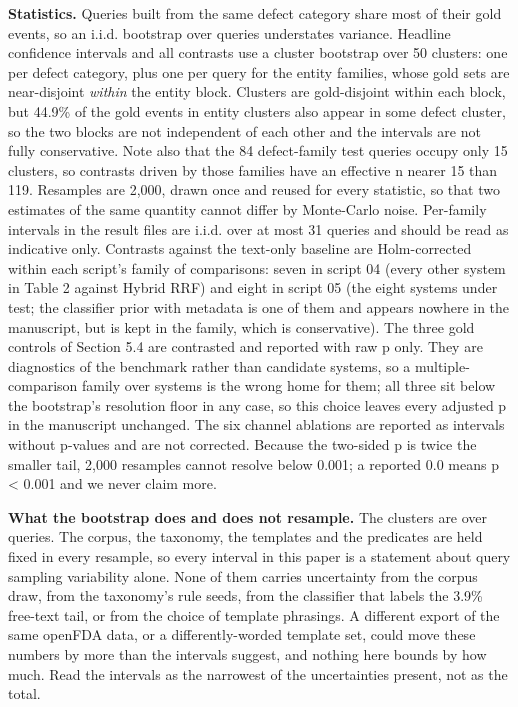 \documentclass[runningheads]{llncs}
\begin{document}
\textbf{Statistics.} Queries built from the same defect category share most of their gold events, so an i.i.d. bootstrap over queries understates variance. Headline confidence intervals and all contrasts use a cluster bootstrap over 50 clusters: one per defect category, plus one per query for the entity families, whose gold sets are near-disjoint \textit{within} the entity block. Clusters are gold-disjoint within each block, but 44.9\% of the gold events in entity clusters also appear in some defect cluster, so the two blocks are not independent of each other and the intervals are not fully conservative. Note also that the 84 defect-family test queries occupy only 15 clusters, so contrasts driven by those families have an effective n nearer 15 than 119. Resamples are 2,000, drawn once and reused for every statistic, so that two estimates of the same quantity cannot differ by Monte-Carlo noise. Per-family intervals in the result files are i.i.d. over at most 31 queries and should be read as indicative only. Contrasts against the text-only baseline are Holm-corrected within each script's family of comparisons: seven in script 04 (every other system in Table 2 against Hybrid RRF) and eight in script 05 (the eight systems under test; the classifier prior with metadata is one of them and appears nowhere in the manuscript, but is kept in the family, which is conservative). The three gold controls of Section 5.4 are contrasted and reported with raw p only. They are diagnostics of the benchmark rather than candidate systems, so a multiple-comparison family over systems is the wrong home for them; all three sit below the bootstrap's resolution floor in any case, so this choice leaves every adjusted p in the manuscript unchanged. The six channel ablations are reported as intervals without p-values and are not corrected. Because the two-sided p is twice the smaller tail, 2,000 resamples cannot resolve below 0.001; a reported 0.0 means p < 0.001 and we never claim more.

\textbf{What the bootstrap does and does not resample.} The clusters are over queries. The corpus, the taxonomy, the templates and the predicates are held fixed in every resample, so every interval in this paper is a statement about query sampling variability alone. None of them carries uncertainty from the corpus draw, from the taxonomy's rule seeds, from the classifier that labels the 3.9\% free-text tail, or from the choice of template phrasings. A different export of the same openFDA data, or a differently-worded template set, could move these numbers by more than the intervals suggest, and nothing here bounds by how much. Read the intervals as the narrowest of the uncertainties present, not as the total.
\end{document}
